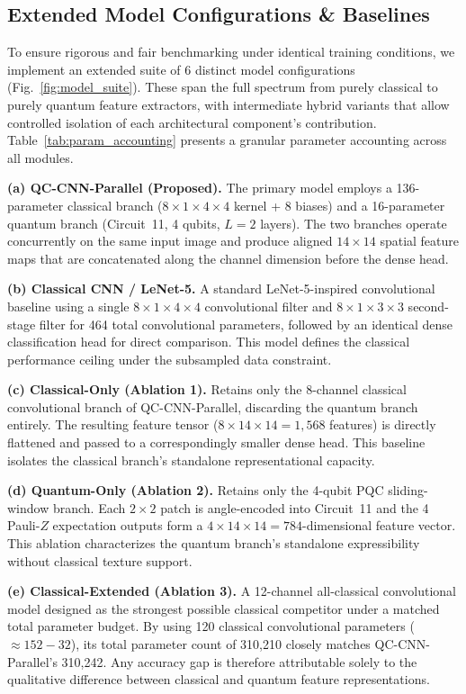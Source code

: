 \documentclass[pdflatex,sn-mathphys-num]{sn-jnl}%
\theoremstyle{thmstyleone}%
\theoremstyle{thmstyletwo}%
\theoremstyle{thmstylethree}%
\begin{document}
\subsection{Extended Model Configurations \& Baselines}
To ensure rigorous and fair benchmarking under identical training conditions, we implement an extended suite of 6 distinct model configurations (Fig.~\ref{fig:model_suite}). These span the full spectrum from purely classical to purely quantum feature extractors, with intermediate hybrid variants that allow controlled isolation of each architectural component's contribution. Table~\ref{tab:param_accounting} presents a granular parameter accounting across all modules.

\textbf{(a) QC-CNN-Parallel (Proposed).} The primary model employs a 136-parameter classical branch ($8 \times 1 \times 4 \times 4$ kernel + 8 biases) and a 16-parameter quantum branch (Circuit~11, 4 qubits, $L=2$ layers). The two branches operate concurrently on the same input image and produce aligned $14 \times 14$ spatial feature maps that are concatenated along the channel dimension before the dense head.

\textbf{(b) Classical CNN / LeNet-5.} A standard LeNet-5-inspired convolutional baseline \cite{huang2021experimental} using a single $8 \times 1 \times 4 \times 4$ convolutional filter and $8 \times 1 \times 3 \times 3$ second-stage filter for 464 total convolutional parameters, followed by an identical dense classification head for direct comparison. This model defines the classical performance ceiling under the subsampled data constraint.

\textbf{(c) Classical-Only (Ablation 1).} Retains only the 8-channel classical convolutional branch of QC-CNN-Parallel, discarding the quantum branch entirely. The resulting feature tensor ($8 \times 14 \times 14 = 1,568$ features) is directly flattened and passed to a correspondingly smaller dense head. This baseline isolates the classical branch's standalone representational capacity.

\textbf{(d) Quantum-Only (Ablation 2).} Retains only the 4-qubit PQC sliding-window branch. Each $2 \times 2$ patch is angle-encoded into Circuit~11 and the 4 Pauli-$Z$ expectation outputs form a $4 \times 14 \times 14 = 784$-dimensional feature vector. This ablation characterizes the quantum branch's standalone expressibility without classical texture support.

\textbf{(e) Classical-Extended (Ablation 3).} A 12-channel all-classical convolutional model designed as the strongest possible classical competitor under a matched total parameter budget. By using 120 classical convolutional parameters ($\approx 152 - 32$), its total parameter count of 310,210 closely matches QC-CNN-Parallel's 310,242. Any accuracy gap is therefore attributable solely to the qualitative difference between classical and quantum feature representations.
\end{document}
